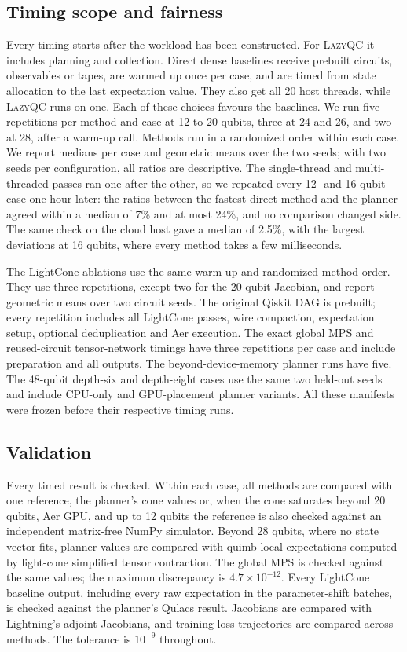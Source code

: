 \subsection{Timing scope and fairness}
Every timing starts after the workload has been constructed. For \textsc{LazyQC} it includes planning and collection. Direct dense baselines receive prebuilt circuits, observables or tapes, are warmed up once per case, and are timed from state allocation to the last expectation value. They also get all 20 host threads, while \textsc{LazyQC} runs on one. Each of these choices favours the baselines. We run five repetitions per method and case at 12 to 20 qubits, three at 24 and 26, and two at 28, after a warm-up call. Methods run in a randomized order within each case. We report medians per case and geometric means over the two seeds; with two seeds per configuration, all ratios are descriptive. The single-thread and multi-threaded passes ran one after the other, so we repeated every 12- and 16-qubit case one hour later: the ratios between the fastest direct method and the planner agreed within a median of 7\% and at most 24\%, and no comparison changed side. The same check on the cloud host gave a median of 2.5\%, with the largest deviations at 16 qubits, where every method takes a few milliseconds.

The LightCone ablations use the same warm-up and randomized method order. They use three repetitions, except two for the 20-qubit Jacobian, and report geometric means over two circuit seeds. The original Qiskit DAG is prebuilt; every repetition includes all LightCone passes, wire compaction, expectation setup, optional deduplication and Aer execution. The exact global MPS and reused-circuit tensor-network timings have three repetitions per case and include preparation and all outputs. The beyond-device-memory planner runs have five. The 48-qubit depth-six and depth-eight cases use the same two held-out seeds and include CPU-only and GPU-placement planner variants. All these manifests were frozen before their respective timing runs.

\subsection{Validation}
Every timed result is checked. Within each case, all methods are compared with one reference, the planner's cone values or, when the cone saturates beyond 20 qubits, Aer GPU, and up to 12 qubits the reference is also checked against an independent matrix-free NumPy simulator. Beyond 28 qubits, where no state vector fits, planner values are compared with quimb local expectations computed by light-cone simplified tensor contraction. The global MPS is checked against the same values; the maximum discrepancy is $4.7\times10^{-12}$. Every LightCone baseline output, including every raw expectation in the parameter-shift batches, is checked against the planner's Qulacs result. Jacobians are compared with Lightning's adjoint Jacobians, and training-loss trajectories are compared across methods. The tolerance is $10^{-9}$ throughout.

